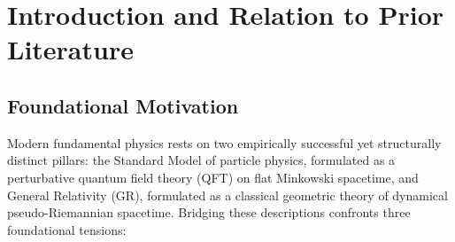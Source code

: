 \documentclass[10pt,aps,prd,twocolumn,superscriptaddress,nofootinbib,floatfix,longbibliography,showkeys]{revtex4-2}
\begin{document}

\maketitle



\section{Introduction and Relation to Prior Literature}\label{sec:1}


\subsection{Foundational Motivation}\label{sec:1.1}

Modern fundamental physics rests on two empirically successful yet structurally distinct pillars: the Standard Model of particle physics, formulated as a perturbative quantum field theory (QFT) on flat Minkowski spacetime, and General Relativity (GR), formulated as a classical geometric theory of dynamical pseudo-Riemannian spacetime. Bridging these descriptions confronts three foundational tensions:
\end{document}
